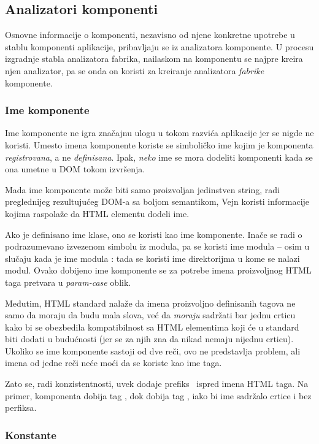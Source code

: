 \subsection{Analizatori komponenti}

Osnovne informacije o komponenti, nezavisno od njene konkretne upotrebe u stablu komponenti aplikacije, pribavljaju se iz analizatora komponente.
U procesu izgradnje stabla analizatora fabrika, nailaskom na komponentu se najpre kreira njen analizator, pa se onda on koristi za kreiranje analizatora \emph{fabrike} komponente.

\subsubsection{Ime komponente}

Ime komponente ne igra značajnu ulogu u tokom razvića aplikacije jer se nigde ne koristi.
Umesto imena komponente koriste se simboličko ime kojim je komponenta \emph{registrovana}, a ne \emph{definisana}.
Ipak, \emph{neko} ime se mora dodeliti komponenti kada se ona umetne u DOM tokom izvršenja.

Mada ime komponente može biti samo proizvoljan jedinstven string, radi preglednijeg rezultujućeg DOM-a sa boljom semantikom, Vejn koristi informacije kojima raspolaže da HTML elementu dodeli ime.

Ako je definisano ime klase, ono se koristi kao ime komponente.
Inače se radi o podrazumevano izvezenom simbolu iz modula, pa se koristi ime modula -- osim u slučaju kada je ime modula : tada se koristi ime direktorijma u kome se nalazi modul.
Ovako dobijeno ime komponente se za potrebe imena proizvoljnog HTML taga pretvara u \textit{param-case} oblik.

Međutim, HTML standard nalaže da imena proizvoljno definisanih tagova ne samo da moraju da budu mala slova, već da \emph{moraju} sadržati bar jednu crticu kako bi se obezbedila kompatibilnost sa HTML elementima koji će u standard biti dodati u budućnosti (jer se za njih zna da nikad nemaju nijednu crticu).
Ukoliko se ime komponente sastoji od dve reči, ovo ne predstavlja problem, ali imena od jedne reči neće moći da se koriste kao ime taga.

Zato se, radi konzistentnosti, uvek dodaje prefiks~ ispred imena HTML taga.
Na primer, komponenta  dobija tag , dok  dobija tag , iako bi ime sadržalo crtice i bez perfiksa.

\subsubsection{Konstante}\label{sec:konstante}

